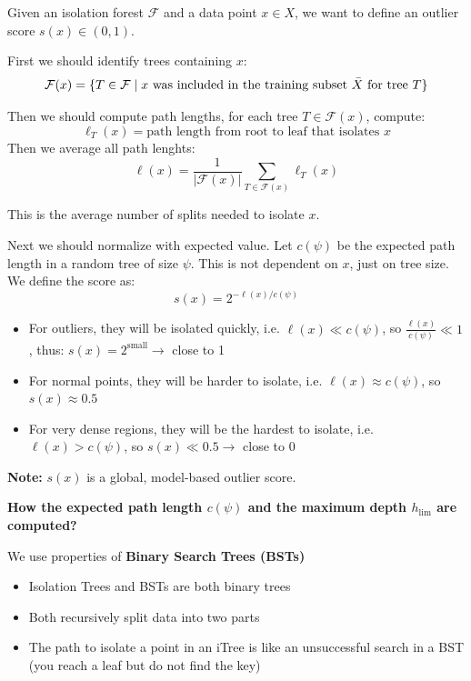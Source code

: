 \documentclass{article}
\begin{document}

Given an isolation forest $\mathcal{F}$ and a data point $x \in X$, we want to define an outlier score $s(x) \in (0,1)$.

First we should identify trees containing $x$:
\[
\mathcal{F}(x) = \{T \in \mathcal{F} \mid x \text{ was included in the training subset }\bar{X} \text{ for tree }T\}
\]

Then we should compute path lengths, for each tree $T \in \mathcal{F}(x)$, compute:
\[
\ell_T (x) = \text{path length from root to leaf that isolates }x 
\]
Then we average all path lenghts:
\[
\ell(x) = \frac{1}{| \mathcal{F}(x) |} \sum_{T \in \mathcal{F}(x)} \ell_T (x)
\]

This is the average number of splits needed to isolate $x$. 

Next we should normalize with expected value. Let $c(\psi)$ be the expected path length in a random tree of size $\psi$. This is not dependent on $x$, just on tree size. We define the score as:
\[
s(x) = 2^{-\ell(x) / c(\psi)}
\]

\begin{itemize}
    \item For outliers, they will be isolated quickly, i.e. $\ell(x) \ll c(\psi) $, so $\frac{\ell(x)}{c(\psi)} \ll 1$, thus: $s(x) = 2^{\text{small}} \to $ close to 1
    \item For normal points, they will be harder to isolate, i.e. $\ell(x) \approx c(\psi) $, so $s(x) \approx 0.5$
    \item For very dense regions, they will be the hardest to isolate, i.e. $\ell(x) > c(\psi) $, so $s(x) \ll 0.5 \to$ close to 0
\end{itemize}

\textbf{Note: }$s(x)$ is a global, model-based outlier score.

\textbf{How the expected path length $c(\psi)$ and the maximum depth $h_{\text{lim}}$ are computed?}

We use properties of \textbf{Binary Search Trees (BSTs)}
\begin{itemize}
    \item Isolation Trees and BSTs are both binary trees
    \item Both recursively split data into two parts
    \item The path to isolate a point in an iTree is like an unsuccessful search in a BST (you reach a leaf but do not find the key)
\end{itemize}
\end{document}
